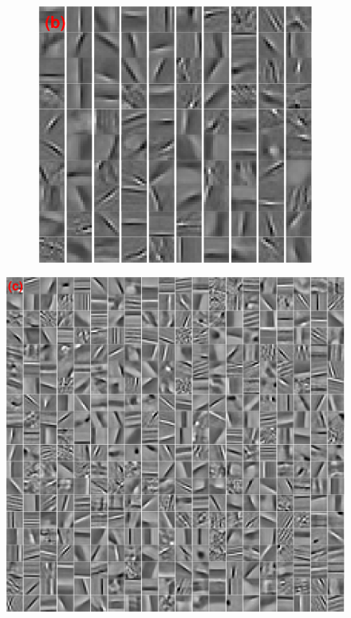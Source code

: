 \begin{figure}[h]
\begin{minipage}{0.4\textwidth}
\begin{subfigure}{1\textwidth}
    \centering
  \includegraphics[width=0.75\linewidth]{figure/online100-filter.pdf}
\end{subfigure}
\end{minipage}
\begin{minipage}{0.6\textwidth}
\centering
\includegraphics[width=0.97\linewidth]{figure/online400-filter.pdf}
\vspace*{2mm}
\end{minipage}
\begin{minipage}{1\textwidth}

\end{minipage}
\end{figure}
